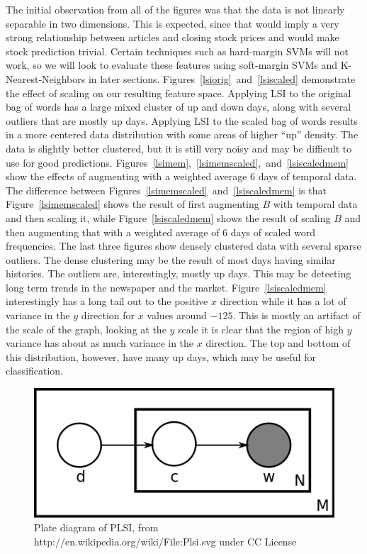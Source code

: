 \documentclass[10pt, twocolumn]{article}
\begin{document}
The initial observation from all of the figures was that the data is not linearly separable in two dimensions. This is expected, since that would imply a very strong relationship between articles and closing stock prices and would make stock prediction trivial. Certain techniques such as hard-margin SVMs will not work, so we will look to evaluate these features using soft-margin SVMs and K-Nearest-Neighbors in later sections. Figures~\ref{lsiorig}~and~\ref{lsiscaled} demonstrate the effect of scaling on our resulting feature space. Applying LSI to the original bag of words has a large mixed cluster of up and down days, along with several outliers that are mostly up days. Applying LSI to the scaled bag of words results in a more centered data distribution with some areas of higher ``up'' density. The data is slightly better clustered, but it is still very noisy and may be difficult to use for good predictions. Figures~\ref{lsimem},~\ref{lsimemscaled},~and~\ref{lsiscaledmem} show the effects of augmenting with a weighted average 6 days of temporal data. The difference between Figures~\ref{lsimemscaled}~and~\ref{lsiscaledmem} is that Figure~\ref{lsimemscaled} shows the result of first augmenting $B$ with temporal data and then scaling it, while Figure~\ref{lsiscaledmem} shows the result of scaling $B$ and then augmenting that with a weighted average of 6 days of scaled word frequencies. The last three figures show densely clustered data with several sparse outliers. The dense clustering may be the result of most days having similar histories. The outliers are, interestingly, mostly up days. This may be detecting long term trends in the newspaper and the market. Figure~\ref{lsiscaledmem} interestingly has a long tail out to the positive $x$ direction while it has a lot of variance in the $y$ direction for $x$ values around $-125$. This is mostly an artifact of the scale of the graph, looking at the $y$ scale it is clear that the region of high $y$ variance has about as much variance in the $x$ direction. The top and bottom of this distribution, however, have many up days, which may be useful for classification.

\begin{figure}

\centering
\includegraphics[scale=0.3]{plots/plsi.png}

\caption{Plate diagram of PLSI, from http://en.wikipedia.org/wiki/File:Plsi.svg under CC License}
\label{fig:plsi}
\end{figure}
\end{document}
